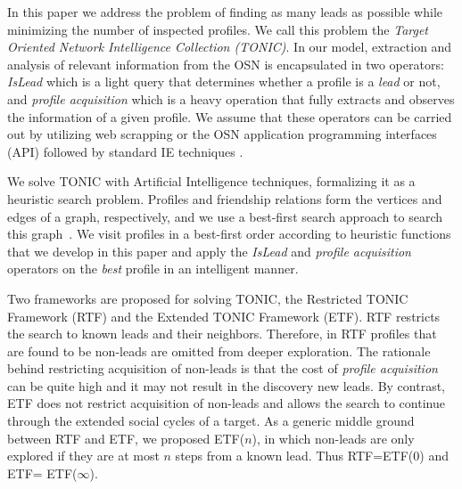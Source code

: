 \documentclass[journal]{IEEEtran}
\begin{document}

In this paper we address the problem of finding as many leads as possible while minimizing the number of inspected profiles. We call this problem the {\em Target Oriented Network Intelligence Collection (TONIC)}. 
In our model, extraction and analysis of relevant information from the OSN is encapsulated in two operators: {\em IsLead} which is a light query that determines whether a profile is a {\em lead} or not, and {\em profile acquisition} which is a heavy operation that fully extracts and observes the information of a given profile.
We assume that these operators can be carried out by utilizing web scrapping or the OSN application programming interfaces (API) followed by standard IE techniques \cite{chang2006survey,tang2010aCombinationApproach,pawlas2012universal}.


We solve TONIC with Artificial Intelligence techniques, formalizing it as a heuristic search problem.  Profiles and friendship relations form the vertices and edges of a  graph, respectively, and we use a best-first search approach to search this graph~\cite{vempaty1991depthFirst,russell2010artificialIntelligence}. We visit profiles in a best-first order according to heuristic functions that we develop in this paper and apply the {\em IsLead} and {\em profile acquisition} operators on the {\em best} profile in an intelligent manner. 


Two frameworks are proposed for solving TONIC, the Restricted TONIC Framework (RTF) and the Extended TONIC Framework (ETF). RTF restricts the search to known leads and their neighbors. Therefore, in RTF profiles that are found to be non-leads are omitted from deeper exploration. The rationale behind restricting acquisition of non-leads is that the cost of {\em profile acquisition} can be quite high and it may not result in the discovery new leads. 
By contrast, ETF does not restrict acquisition of non-leads and allows the search to continue through the extended social cycles of a target. As a generic middle ground between RTF and ETF, we proposed ETF($n$), in which non-leads are only explored if they are at most $n$ steps from a known lead. Thus RTF=ETF(0) and ETF= ETF($\infty$). 
\end{document}
